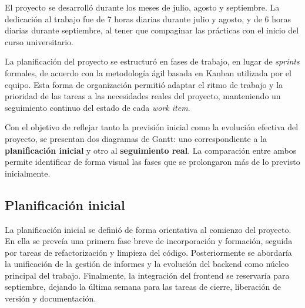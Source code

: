 \documentclass[11pt,a4paper,titlepage,oneside]{report}
\begin{document}
El proyecto se desarrolló durante los meses de julio, agosto y septiembre. La dedicación al trabajo fue de 7 horas diarias durante julio y agosto, y de 6 horas diarias durante septiembre, al tener que compaginar las prácticas con el inicio del curso universitario.

La planificación del proyecto se estructuró en fases de trabajo, en lugar de \textit{sprints} formales, de acuerdo con la metodología ágil basada en Kanban utilizada por el equipo. Esta forma de organización permitió adaptar el ritmo de trabajo y la prioridad de las tareas a las necesidades reales del proyecto, manteniendo un seguimiento continuo del estado de cada \textit{work item}.

Con el objetivo de reflejar tanto la previsión inicial como la evolución efectiva del proyecto, se presentan dos diagramas de Gantt: uno correspondiente a la \textbf{planificación inicial} y otro al \textbf{seguimiento real}. La comparación entre ambos permite identificar de forma visual las fases que se prolongaron más de lo previsto inicialmente.

\subsection{Planificación inicial}

La planificación inicial se definió de forma orientativa al comienzo del proyecto. En ella se preveía una primera fase breve de incorporación y formación, seguida por tareas de refactorización y limpieza del código. Posteriormente se abordaría la unificación de la gestión de informes y la evolución del backend como núcleo principal del trabajo. Finalmente, la integración del frontend se reservaría para septiembre, dejando la última semana para las tareas de cierre, liberación de versión y documentación.
\end{document}
